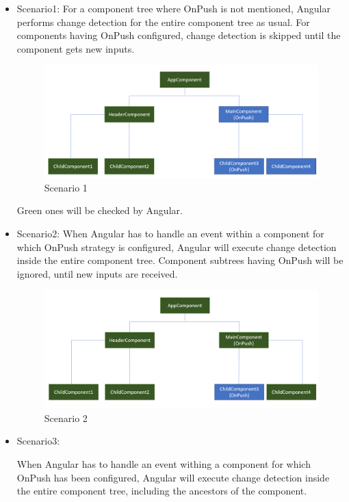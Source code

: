 \documentclass{report}
\begin{document}
\begin{itemize}
	\item Scenario1:
For a component tree where OnPush is not mentioned, Angular performs change detection for the entire component tree as usual. For components having OnPush configured, change detection is skipped until the component gets new inputs.

\begin{figure}[h]
	\centerline{\includegraphics[scale=.5]{onpush11695758391262.png}}
	\caption{Scenario 1}
	\label{Scenario 1}
\end{figure}
Green ones will be checked by Angular.

\item Scenario2:
When Angular has to handle an event within a component for which OnPush strategy is configured, Angular will execute change detection inside the entire component tree. Component subtrees having OnPush will be ignored, until new inputs are received. 

\begin{figure}[h]
	\centerline{\includegraphics[scale=.5]{onpush21695758405033.png}}
	\caption{Scenario 2}
	\label{Scenario 2}
\end{figure}
\item Scenario3:

When Angular has to handle an event withing a component for which OnPush has been configured, Angular will execute change detection inside the entire component tree, including the ancestors of the component.


\end{itemize}
\end{document}
